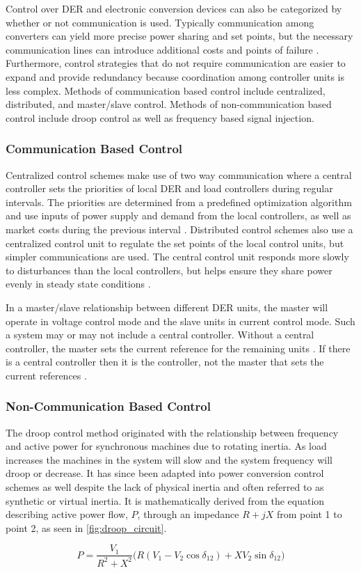 Control over DER and electronic conversion devices can also be categorized by whether or not communication is used. Typically communication among converters can yield more precise power sharing and set points, but the necessary communication lines can introduce additional costs and points of failure \cite{Vandoorn2013}. Furthermore, control strategies that do not require communication are easier to expand and provide redundancy because coordination among controller units is less complex. Methods of communication based control include centralized, distributed, and master\slash slave control. Methods of non-communication based control include droop control as well as frequency based signal injection.

\subsubsection{Communication Based Control}
Centralized control schemes make use of two way communication where a central controller sets the priorities of local DER and load controllers during regular intervals. The priorities are determined from a predefined optimization algorithm and use inputs of power supply and demand from the local controllers, as well as market costs during the previous interval \cite{Katiraei2008}. Distributed control schemes also use a centralized control unit to regulate the set points of the local control units, but simpler communications are used. The central control unit responds more slowly to disturbances than the local controllers, but helps ensure they share power evenly in steady state conditions \cite{Prodanovic2006}. 

In a master\slash slave relationship between different DER units, the master will operate in voltage control mode and the slave units in current control mode. Such a system may or may not include a central controller. Without a central controller, the master sets the current reference for the remaining units \cite{Siri1992}. If there is a central controller then it is the controller, not the master that sets the current references \cite{Chen1995}.

\subsubsection{Non-Communication Based Control}
\label{sec:droop}
The droop control method originated with the relationship between frequency and active power for synchronous machines due to rotating inertia. As load increases the machines in the system will slow and the system frequency will droop or decrease. It has since been adapted into power conversion control schemes as well despite the lack of physical inertia and often referred to as synthetic or virtual inertia. It is mathematically derived from the equation describing active power flow, $P$, through an impedance $ R + jX $ from point 1 to point 2, as seen in \autoref{fig:droop_circuit}.

\begin{equation}
P = \frac{V_{1}}{R^2 + X^2} \big( R \left( V_{1}-V_{2}\cos{\delta_{12}} \right) +X V_{2} \sin{\delta_{12}} \big)
\end{equation}

